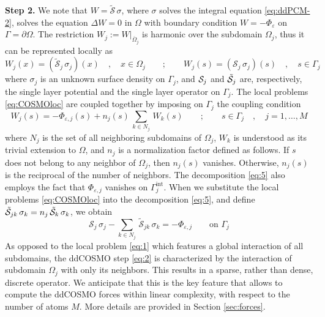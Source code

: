 {\bf Step 2.} 
We note that $W = \tilde{\mathcal{S}}\,\sigma$, where $\sigma$ solves the integral equation \eqref{eq:ddPCM-2}, solves the equation $\Delta W = 0$ in $\Omega$ with boundary condition $W=-\Phi_\varepsilon$ on $\Gamma=\partial \Omega$. 
The restriction $W_j := W |_{\overline{\Omega}_j}$ is harmonic over the subdomain $\Omega_j$, thus it can be represented  locally as 
\begin{equation}\label{eq:COSMOloc}
W_j(x) = (\tilde{\mathcal{S}}_j \,  \sigma_j) (x) \quad , \quad x \in \Omega_j \qquad ; \qquad
W_j(s) = (\mathcal{S}_j \,  \sigma_j) (s) \quad , \quad s \in \Gamma_j
\end{equation}
where $\sigma_j$ is an unknown surface density on $\Gamma_j$, and $\mathcal{S}_j$ and $\tilde{\mathcal{S}}_j$ are, respectively, the single layer potential and the single layer operator on $\Gamma_j$. The local problems \eqref{eq:COSMOloc} are coupled together by imposing on $\Gamma_j$ the coupling condition
\begin{equation}\label{eq:5}
W_j(s) = - \Phi_{\varepsilon,j}(s) +  n_j(s) \, \sum_{k \in N_j} \,{W}_k(s) \qquad ; \qquad s \in \Gamma_j \quad , \quad j = 1, \ldots , M
\end{equation}
where $N_j$ is the set of all neighboring subdomains of $\Omega_j$, $W_k$ is understood as its trivial extension to $\Omega$, and $n_j$ is a normalization factor defined as follows. If $s$ does not belong to any neighbor of $\Omega_j$, then $n_j(s)$ vanishes. Otherwise, $n_j(s)$ is the reciprocal of the number of neighbors. The decomposition \eqref{eq:5} also employs the fact that $\Phi_{\varepsilon,j}$ vanishes on $\Gamma_j^\text{int}$. When we substitute the local problems \eqref{eq:COSMOloc} into the decomposition \eqref{eq:5}, and define $\tilde{\mathcal{S}}_{jk} \, \sigma_k = n_j \, \tilde{\mathcal{S}}_k \, \sigma_k$, we obtain
\begin{equation}\label{eq:2}
\mathcal{S}_j \, \sigma_j  -  \sum_{k \in N_j} \, \tilde{\mathcal{S}}_{jk} \, \sigma_k = -  \Phi_{\varepsilon,j} \qquad \text{on } \Gamma_j
\end{equation}
As opposed to the local problem \eqref{eq:1} which features a global interaction of all subdomains, the ddCOSMO step \eqref{eq:2} is characterized by the interaction of subdomain $\Omega_j$ with only its neighbors. This results in a sparse, rather than dense, discrete operator. We anticipate that this is the key feature that allows to compute the ddCOSMO forces within linear complexity, with respect to the number of atoms $M$. More details are provided in Section \ref{sec:forces}.

